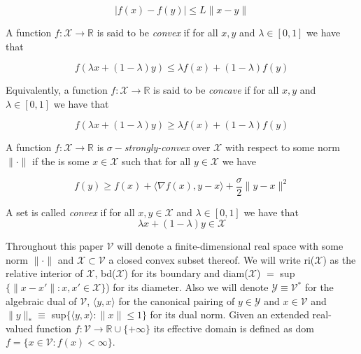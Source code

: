 \begin{equation*}
    |f(x) - f(y)| \le L\|x - y\|
\end{equation*}

A function $f:\mathcal{X} \to \mathbb{R}$ is said to be \textit{convex} if for all $x,y$ and $\lambda \in [0,1]$ we have that 

\begin{equation*}
    f(\lambda x + (1-\lambda)y) \le \lambda f(x) + (1-\lambda)f(y)
\end{equation*}

Equivalently, a function $f:\mathcal{X} \to \mathbb{R}$ is said to be \textit{concave} if for all $x,y$ and $\lambda \in [0,1]$ we have that 

\begin{equation*}
    f(\lambda x + (1-\lambda)y) \ge \lambda f(x) + (1-\lambda)f(y)
\end{equation*}

A function $f:\mathcal{X} \to \mathbb{R}$ is $\sigma-$\textit{strongly-convex} over $\mathcal{X}$ with respect to some norm $\|\cdot\|$ if the is some $x \in \mathcal{X}$ such that for all $y \in \mathcal{X}$ we have 

\begin{equation*}
    f(y) \ge f(x) + \langle\nabla f(x),y - x\rangle + \frac{\sigma}{2}\|y - x\|^2
\end{equation*}

A set is called \textit{convex} if for all $x,y \in \mathcal{X}$ and $\lambda \in [0,1]$ we have that 
\begin{equation*}
    \lambda x + (1-\lambda)y \in \mathcal{X} 
\end{equation*}

Throughout this paper $\mathcal{V}$ will denote a finite-dimensional real space with some norm $\|\cdot\|$ and $\mathcal{X} \subset \mathcal{V}$ a closed convex subset thereof. We will write ri($\mathcal{X}$) as the relative interior of $\mathcal{X}$, bd($\mathcal{X}$) for its boundary and diam($\mathcal{X}$) $ = $ sup$\{\|x-x'\|: x,x' \in \mathcal{X}\}$) for its diameter. Also we will denote $\mathcal{Y} \equiv \mathcal{V}^*$ for the algebraic dual of $\mathcal{V}$, $\langle y,x \rangle$ for the canonical pairing of $y \in \mathcal{Y}$ and $x \in \mathcal{V}$ and $\|y\|_* \equiv $ sup$\{\langle y,x \rangle: \|x\| \le 1\}$ for its dual norm. Given an extended real-valued function $f: \mathcal{V} \to \mathbb{R} \cup \{+\infty\}$ its effective domain is defined as dom$f = \{x \in \mathcal{V} : f(x) < \infty\}$.


